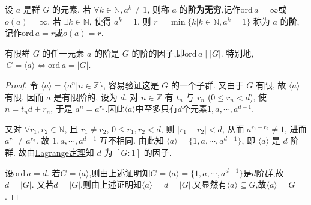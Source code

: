 \documentclass[../../main.tex]{subfiles}%
\begin{document}
\begin{definition}
设 \( a \) 是群 \( G \) 的元素. 若 \( \forall k \in \mathbb{N}, a^k \neq 1 \), 则称 \( a \) 的\textbf{阶为无穷},记作$\mathrm{ord}\,a=\infty $或$o(a)=\infty$. 若 \( \exists k \in \mathbb{N} \), 使得 \( a^k = 1 \), 则 \( r=\min\{k|k \in \mathbb{N}, a^k = 1\} \) 称为 \( a \) 的\textbf{阶},记作$\mathrm{ord}\,a=r$或$o(a)=r$.
\end{definition}

\begin{theorem}\label{theorem:抽象代数-推论 1.3.4}
有限群 \( G \) 的任一元素 \( a \) 的阶是 \( G \) 的阶的因子,即$\text{ord}\,a\mid |G|.$
特别地,$\,G=\langle a \rangle\iff \text{ord}\,a=|G|.$
\end{theorem}
\begin{proof}

令 \( \langle a \rangle = \{a^n|n \in \mathbb{Z}\} \), 容易验证这是 \( G \) 的一个子群. 又由于 \( G \) 有限, 故 \( \langle a \rangle \) 有限, 因而 \( a \) 是有限阶的, 设为 \( d \). 对 \( n \in \mathbb{Z} \) 有 \( t_n \) 与 \( r_n \) (\( 0 \leqslant r_n < d \)), 使 \( n = t_nd + r_n \), 于是 \( a^n = a^{r_n} \).因此$\langle a \rangle$中至多只有$d$个元素$1,a,\cdots,a^{d-1}$.

又对 \( \forall r_1, r_2 \in \mathbb{N} \), 且 \( r_1 \neq r_2 \), \( 0 \leqslant r_1, r_2 < d \), 则 \( |r_1 - r_2| < d \), 从而 \( a^{r_1 - r_2} \neq 1 \), 进而 \( a^{r_1} \neq a^{r_2} \). 故 \( 1, a, \cdots, a^{d-1} \) 互不相同.
由此知 \( \langle a \rangle = \{1, a, \cdots, a^{d-1}\} \), 即 \( \langle a \rangle \) 是 \( d \) 阶群. 故由\hyperref[theorem:抽象代数--Lagrange定理]{Lagrange定理}知 \( d \) 为 \( [G:1] \) 的因子.

设$\text{ord}\,a=d$.
若$G=\langle a \rangle$,则由上述证明知$G=\langle a \rangle = \{1, a, \cdots, a^{d-1}\}$是$d$阶群,故$d=|G|.$
又若$d=|G|$,则由上述证明知$\langle a \rangle=d=|G|$.又显然有$\langle a \rangle\subseteq G$,故$\langle a \rangle = G$.
\end{proof}
\end{document}
